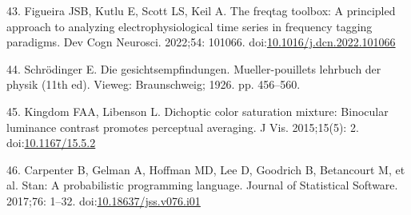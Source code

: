 \documentclass[
]{article}
\begin{document}
\leavevmode\hypertarget{ref-Figueira2022}{}%
43. Figueira JSB, Kutlu E, Scott LS, Keil A. The freqtag toolbox: A principled approach to analyzing electrophysiological time series in frequency tagging paradigms. Dev Cogn Neurosci. 2022;54: 101066. doi:\href{https://doi.org/10.1016/j.dcn.2022.101066}{10.1016/j.dcn.2022.101066}

\leavevmode\hypertarget{ref-Schrodinger1926}{}%
44. Schrödinger E. Die gesichtsempfindungen. Mueller-pouillets lehrbuch der physik (11th ed). Vieweg: Braunschweig; 1926. pp. 456--560.

\leavevmode\hypertarget{ref-Kingdom2015}{}%
45. Kingdom FAA, Libenson L. Dichoptic color saturation mixture: Binocular luminance contrast promotes perceptual averaging. J Vis. 2015;15(5): 2. doi:\href{https://doi.org/10.1167/15.5.2}{10.1167/15.5.2}

\leavevmode\hypertarget{ref-Carpenter2017}{}%
46. Carpenter B, Gelman A, Hoffman MD, Lee D, Goodrich B, Betancourt M, et al. Stan: A probabilistic programming language. Journal of Statistical Software. 2017;76: 1--32. doi:\href{https://doi.org/10.18637/jss.v076.i01}{10.18637/jss.v076.i01}
\end{document}
